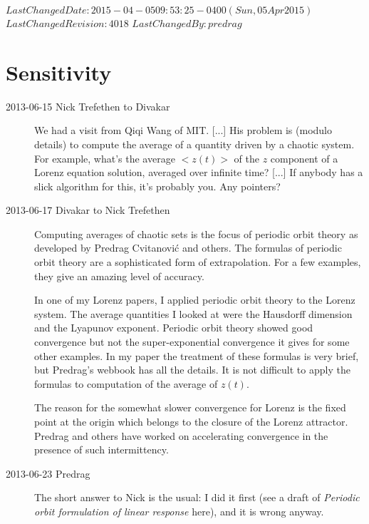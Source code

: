 \ifsvnmulti
 {$LastChangedDate: 2015-04-05 09:53:25 -0400 (Sun, 05 Apr 2015) $}
 {$LastChangedRevision: 4018 $} {$LastChangedBy: predrag $}
\fi

\chapter{Sensitivity}
\label{c-sensitive}

\begin{description}

\item[2013-06-15 Nick Trefethen to Divakar] %
We had a visit from Qiqi Wang of MIT.  [...] His problem is (modulo
details) to compute the average of a quantity driven by a chaotic
system.  For example, what's the average $<z(t)>$ of the $z$
component of a Lorenz equation solution, averaged over infinite time?
[...] If anybody has a slick algorithm for this, it's probably you.
Any pointers?


\item[2013-06-17 Divakar to Nick Trefethen]
Computing averages of chaotic sets is the focus of periodic orbit
theory as developed by Predrag Cvitanovi\'c and others.
The formulas of periodic orbit theory are a sophisticated form of
extrapolation. For a few examples, they give an amazing level of
accuracy.

In one of my Lorenz papers, I applied periodic orbit theory
to the Lorenz system. The average quantities I looked at were the
Hausdorff dimension and the Lyapunov exponent. Periodic orbit theory
showed good convergence but not the super-exponential convergence it
gives for some other examples. In my paper the treatment of these
formulas is very brief, but Predrag's webbook \wwwcb{} has all the
details. It is not difficult to apply the formulas to computation of the
average of $z(t)$.

The reason for the somewhat slower convergence for Lorenz is the
fixed point at the origin which belongs to the closure of the Lorenz
attractor. Predrag and others have worked on accelerating convergence
in the presence of such intermittency.

\item[2013-06-23 Predrag] The short answer to Nick is the usual: I
did it first (see a draft of \emph{Periodic orbit formulation of
linear response}
{here}), and it is wrong anyway.


\end{description}
